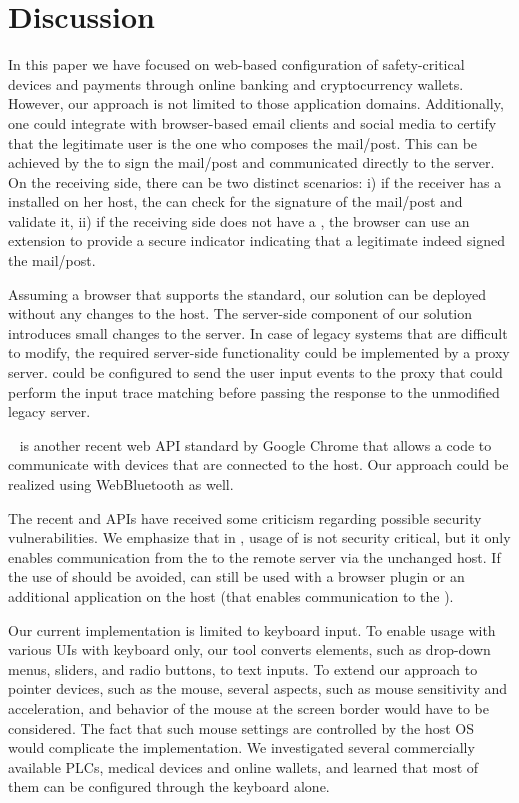 \section{Discussion}
\label{sec:discussion}

 In this paper we have focused on web-based configuration of safety-critical devices and payments through online banking and cryptocurrency wallets. However, our approach is not limited to those application domains. Additionally, one could integrate \name with browser-based email clients and social media to certify that the legitimate user is the one who composes the mail/post. This can be achieved by the \device to sign the mail/post and communicated directly to the server. On the receiving side, there can be two distinct scenarios: i) if the receiver has a \device installed on her host, the \device can check for the signature of the mail/post and validate it, ii) if the receiving side does not have a \device, the browser can use an extension to provide a secure indicator indicating that a legitimate \device indeed signed the mail/post.

 Assuming a browser that supports the \webusb standard, our solution can be deployed without any changes to the host. The server-side component of our solution introduces small changes to the server. In case of legacy systems that are difficult to modify, the required server-side functionality could be implemented by a proxy server. \device could be configured to send the user input events to the proxy that could perform the input trace matching before passing the response to the unmodified legacy server. 

 \webbt~\cite{webbt} is another recent web API standard by Google Chrome that allows a \js code to communicate with devices that are connected to the host. Our approach could be realized using WebBluetooth as well.

 The recent \webusb and \webbt APIs have received some criticism regarding possible security vulnerabilities. We emphasize that in \name, usage of \webusb is not security critical, but it only enables communication from the \device to the remote server via the unchanged host. If the use of \webusb should be avoided, \name can still be used with a browser plugin or an additional application on the host (that enables communication to the \device).

 Our current implementation is limited to keyboard input. To enable usage with various UIs with keyboard only, our tool converts elements, such as drop-down menus, sliders, and radio buttons, to text inputs. To extend our approach to pointer devices, such as the mouse, several aspects, such as mouse sensitivity and acceleration, and behavior of the mouse at the screen border would have to be considered. The fact that such mouse settings are controlled by the host OS would complicate the implementation. We investigated several commercially available PLCs, medical devices and online wallets, and learned that most of them can be configured through the keyboard alone.


